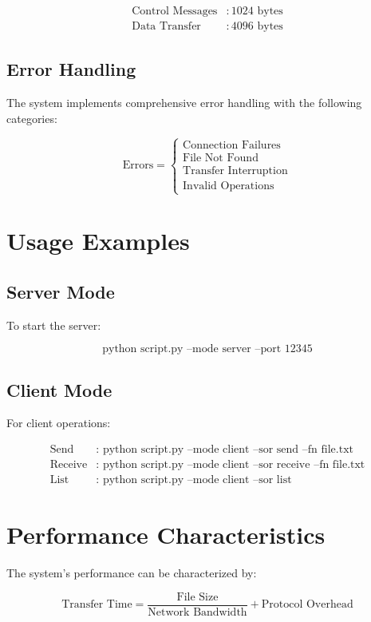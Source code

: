 \documentclass{article}
\begin{document}
\begin{align*}
\text{Control Messages} &: 1024 \text{ bytes} \\
\text{Data Transfer} &: 4096 \text{ bytes}
\end{align*}

\subsection{Error Handling}
The system implements comprehensive error handling with the following categories:

\[
\text{Errors} = \begin{cases}
\text{Connection Failures} \\
\text{File Not Found} \\
\text{Transfer Interruption} \\
\text{Invalid Operations}
\end{cases}
\]

\section{Usage Examples}

\subsection{Server Mode}
To start the server:

\[
\text{python script.py --mode server --port 12345}
\]

\subsection{Client Mode}
For client operations:

\begin{align*}
\text{Send} &: \text{ python script.py --mode client --sor send --fn file.txt} \\
\text{Receive} &: \text{ python script.py --mode client --sor receive --fn file.txt} \\
\text{List} &: \text{ python script.py --mode client --sor list}
\end{align*}

\section{Performance Characteristics}
The system's performance can be characterized by:

\[
\text{Transfer Time} = \frac{\text{File Size}}{\text{Network Bandwidth}} + \text{Protocol Overhead}
\]
\end{document}
